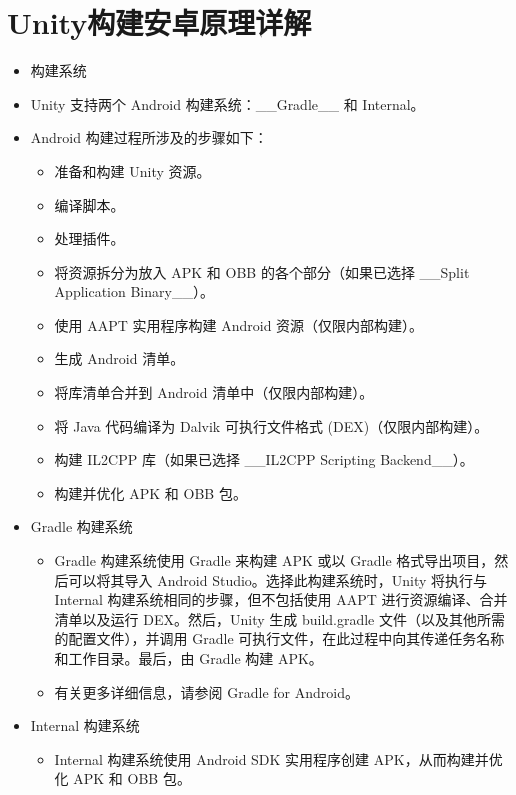 \documentclass[9pt, b5paper]{article}
\begin{document}
\section{Unity构建安卓原理详解}
\label{sec-3}
\begin{itemize}
\item 构建系统
\item Unity 支持两个 Android 构建系统：\_\_Gradle\_\_ 和 Internal。
\item Android 构建过程所涉及的步骤如下：
\begin{itemize}
\item 准备和构建 Unity 资源。
\item 编译脚本。
\item 处理插件。
\item 将资源拆分为放入 APK 和 OBB 的各个部分（如果已选择 \_\_Split Application Binary\_\_）。
\item 使用 AAPT 实用程序构建 Android 资源（仅限内部构建）。
\item 生成 Android 清单。
\item 将库清单合并到 Android 清单中（仅限内部构建）。
\item 将 Java 代码编译为 Dalvik 可执行文件格式 (DEX)（仅限内部构建）。
\item 构建 IL2CPP 库（如果已选择 \_\_IL2CPP Scripting Backend\_\_）。
\item 构建并优化 APK 和 OBB 包。
\end{itemize}
\item Gradle 构建系统
\begin{itemize}
\item Gradle 构建系统使用 Gradle 来构建 APK 或以 Gradle 格式导出项目，然后可以将其导入 Android Studio。选择此构建系统时，Unity 将执行与 Internal 构建系统相同的步骤，但不包括使用 AAPT 进行资源编译、合并清单以及运行 DEX。然后，Unity 生成 build.gradle 文件（以及其他所需的配置文件），并调用 Gradle 可执行文件，在此过程中向其传递任务名称和工作目录。最后，由 Gradle 构建 APK。
\item 有关更多详细信息，请参阅 Gradle for Android。
\end{itemize}
\item Internal 构建系统
\begin{itemize}
\item Internal 构建系统使用 Android SDK 实用程序创建 APK，从而构建并优化 APK 和 OBB 包。
\end{itemize}
\end{itemize}
\end{document}
